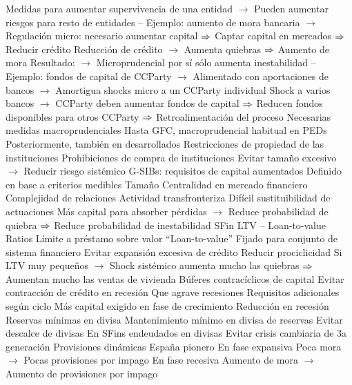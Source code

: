 \documentclass{nuevotema}
\begin{document}
\begin{esquemal}
				\4[] Medidas para aumentar supervivencia de una entidad
				\4[] $\to$ Pueden aumentar riesgos para resto de entidades
				\4[] -- Ejemplo: aumento de mora bancaria
				\4[] $\to$ Regulación micro: necesario aumentar capital
				\4[] $\then$ Captar capital en mercados
				\4[] $\then$ Reducir crédito
				\4[] Reducción de crédito
				\4[] $\to$ Aumenta quiebras
				\4[] $\then$ Aumento de mora
				\4[] Resultado:
				\4[] $\to$ Microprudencial por sí sólo aumenta inestabilidad
				\4[] -- Ejemplo: fondos de capital de CCParty
				\4[] $\to$ Alimentado con aportaciones de bancos
				\4[] $\to$ Amortigua shocks micro a un CCParty individual
				\4[] Shock a varios bancos
				\4[] $\to$ CCParty deben aumentar fondos de capital
				\4[] $\then$ Reducen fondos disponibles para otros CCParty
				\4[] $\then$ Retroalimentación del proceso
				\4[$\then$] Necesarias medidas macroprudenciales
				\4 Hasta GFC, macroprudencial habitual en PEDs
				\4[] Posteriormente, también en desarrollados
			\3 Restricciones de propiedad de las instituciones
				\4 Prohibiciones de compra de instituciones
				\4[] Evitar tamaño excesivo
				\4[] $\to$ Reducir riesgo sistémico
			\3 G-SIBs: requisitos de capital aumentados
				\4 Definido en base a criterios medibles
				\4[] Tamaño
				\4[] Centralidad en mercado financiero
				\4[] Complejidad de relaciones
				\4[] Actividad transfronteriza
				\4[] Difícil sustituibilidad de actuaciones
				\4[] Más capital para absorber pérdidas
				\4[] $\to$ Reduce probabilidad de quiebra
				\4[] $\then$ Reduce probabilidad de inestabilidad SFin
			\3 LTV -- Loan-to-value Ratios
				\4 Límite a préstamo sobre valor
				\4[] ``Loan-to-value''
				\4 Fijado para conjunto de sistema financiero
				\4 Evitar expansión excesiva de crédito
				\4 Reducir prociclicidad
				\4[] Si LTV muy pequeños
				\4[] $\to$ Shock sistémico aumenta mucho las quiebras
				\4[] $\then$ Aumentan mucho las ventas de vivienda
			\3 Búferes contracíclicos de capital
				\4 Evitar contracción de crédito en recesión
				\4[] Que agrave recesiones
				\4 Requisitos adicionales según ciclo
				\4 Más capital exigido en fase de crecimiento
				\4 Reducción en recesión
			\3 Reservas mínimas en divisa
				\4 Mantenimiento mínimo en divisa de reservas
				\4 Evitar descalce de divisas
				\4[] En SFins endeudados en divisas
				\4 Evitar crisis cambiaria de 3a generación
			\3 Provisiones dinámicas
				\4 España pionero
				\4 En fase expansiva
				\4[] Poca mora
				\4[] $\to$ Pocas provisiones por impago
				\4 En fase recesiva
				\4[] Aumento de mora
				\4[] $\to$ Aumento de provisiones por impago

\end{esquemal}
\end{document}
